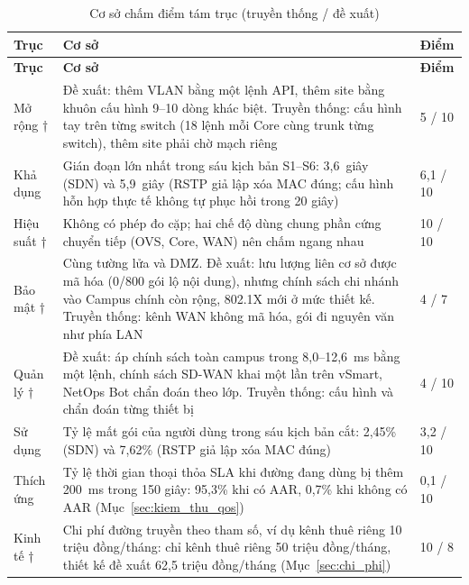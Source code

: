 \begingroup
\small
\setlength{\tabcolsep}{4pt}
\begin{longtable}{|L{2.2cm}|L{\dimexpr\textwidth-2.2cm-2.6cm-6\arrayrulewidth\relax}|P{2.6cm}|}
    \caption{Cơ sở chấm điểm tám trục (truyền thống / đề xuất)}\label{tab:co_so_cham_diem} \\
    \hline
    \textbf{Trục} & \textbf{Cơ sở} & \textbf{Điểm} \\
    \hline
    \endfirsthead
    \hline
    \textbf{Trục} & \textbf{Cơ sở} & \textbf{Điểm} \\
    \hline
    \endhead
    \hline
    \endfoot
    Mở rộng † & Đề xuất: thêm VLAN bằng một lệnh API, thêm site bằng khuôn cấu hình 9--10 dòng khác biệt. Truyền thống: cấu hình tay trên từng switch (18 lệnh mỗi Core cùng trunk từng switch), thêm site phải chờ mạch riêng & 5 / 10 \\
    \hline
    Khả dụng & Gián đoạn lớn nhất trong sáu kịch bản S1--S6: 3,6~giây (SDN) và 5,9~giây (RSTP giả lập xóa MAC đúng; cấu hình hỗn hợp thực tế không tự phục hồi trong 20 giây) & 6,1 / 10 \\
    \hline
    Hiệu suất † & Không có phép đo cặp; hai chế độ dùng chung phần cứng chuyển tiếp (OVS, Core, WAN) nên chấm ngang nhau & 10 / 10 \\
    \hline
    Bảo mật † & Cùng tường lửa và DMZ. Đề xuất: lưu lượng liên cơ sở được mã hóa (0/800 gói lộ nội dung), nhưng chính sách chi nhánh vào Campus chính còn rộng, 802.1X mới ở mức thiết kế. Truyền thống: kênh WAN không mã hóa, gói đi nguyên văn như phía LAN & 4 / 7 \\
    \hline
    Quản lý † & Đề xuất: áp chính sách toàn campus trong 8,0--12,6~ms bằng một lệnh, chính sách SD-WAN khai một lần trên vSmart, NetOps Bot chẩn đoán theo lớp. Truyền thống: cấu hình và chẩn đoán từng thiết bị & 4 / 10 \\
    \hline
    Sử dụng & Tỷ lệ mất gói của người dùng trong sáu kịch bản cắt: 2,45\% (SDN) và 7,62\% (RSTP giả lập xóa MAC đúng) & 3,2 / 10 \\
    \hline
    Thích ứng & Tỷ lệ thời gian thoại thỏa SLA khi đường đang dùng bị thêm 200~ms trong 150 giây: 95,3\% khi có AAR, 0,7\% khi không có AAR (Mục~\ref{sec:kiem_thu_qos}) & 0,1 / 10 \\
    \hline
    Kinh tế † & Chi phí đường truyền theo tham số, ví dụ kênh thuê riêng 10 triệu đồng/tháng: chỉ kênh thuê riêng 50 triệu đồng/tháng, thiết kế đề xuất 62,5 triệu đồng/tháng (Mục~\ref{sec:chi_phi}) & 10 / 8 \\
\end{longtable}
\endgroup

